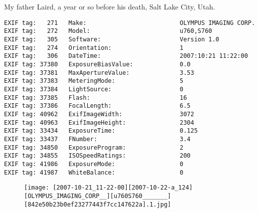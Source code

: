 \section{\protect{}}
\noindent My father Laird, a year or so before his death, Salt Lake City, Utah.
\noindent
\begin{lstlisting}
EXIF tag:   271   Make:                          OLYMPUS IMAGING CORP.  
EXIF tag:   272   Model:                         u760,S760       
EXIF tag:   305   Software:                      Version 1.0                    
EXIF tag:   274   Orientation:                   1
EXIF tag:   306   DateTime:                      2007:10:21 11:22:00
EXIF tag: 37380   ExposureBiasValue:             0.0
EXIF tag: 37381   MaxApertureValue:              3.53
EXIF tag: 37383   MeteringMode:                  5
EXIF tag: 37384   LightSource:                   0
EXIF tag: 37385   Flash:                         16
EXIF tag: 37386   FocalLength:                   6.5
EXIF tag: 40962   ExifImageWidth:                3072
EXIF tag: 40963   ExifImageHeight:               2304
EXIF tag: 33434   ExposureTime:                  0.125
EXIF tag: 33437   FNumber:                       3.4
EXIF tag: 34850   ExposureProgram:               2
EXIF tag: 34855   ISOSpeedRatings:               200
EXIF tag: 41986   ExposureMode:                  0
EXIF tag: 41987   WhiteBalance:                  0

\end{lstlisting}
\clearpage
\begin{figure}
\raggedleft
\texttt{[image: [2007-10-21\_11-22-00][2007-10-22-a\_124][OLYMPUS\_IMAGING\_CORP\_\_][u760S760\_\_\_\_\_\_\_][842e50b23b0ef23277443f7cc147622a].1.jpg]}
\end{figure}


\clearpage
